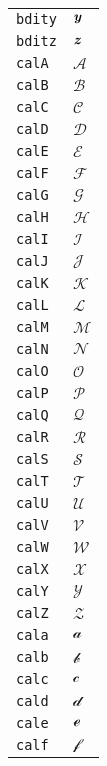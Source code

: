 \begin{longtable}{ll}
\texttt{bdity}&${}{\textbf{\textit{y}}}{}$\\
\texttt{bditz}&${}{\textbf{\textit{z}}}{}$\\
\texttt{calA}&${}{\mathcal{A}}{}$\\
\texttt{calB}&${}{\mathcal{B}}{}$\\
\texttt{calC}&${}{\mathcal{C}}{}$\\
\texttt{calD}&${}{\mathcal{D}}{}$\\
\texttt{calE}&${}{\mathcal{E}}{}$\\
\texttt{calF}&${}{\mathcal{F}}{}$\\
\texttt{calG}&${}{\mathcal{G}}{}$\\
\texttt{calH}&${}{\mathcal{H}}{}$\\
\texttt{calI}&${}{\mathcal{I}}{}$\\
\texttt{calJ}&${}{\mathcal{J}}{}$\\
\texttt{calK}&${}{\mathcal{K}}{}$\\
\texttt{calL}&${}{\mathcal{L}}{}$\\
\texttt{calM}&${}{\mathcal{M}}{}$\\
\texttt{calN}&${}{\mathcal{N}}{}$\\
\texttt{calO}&${}{\mathcal{O}}{}$\\
\texttt{calP}&${}{\mathcal{P}}{}$\\
\texttt{calQ}&${}{\mathcal{Q}}{}$\\
\texttt{calR}&${}{\mathcal{R}}{}$\\
\texttt{calS}&${}{\mathcal{S}}{}$\\
\texttt{calT}&${}{\mathcal{T}}{}$\\
\texttt{calU}&${}{\mathcal{U}}{}$\\
\texttt{calV}&${}{\mathcal{V}}{}$\\
\texttt{calW}&${}{\mathcal{W}}{}$\\
\texttt{calX}&${}{\mathcal{X}}{}$\\
\texttt{calY}&${}{\mathcal{Y}}{}$\\
\texttt{calZ}&${}{\mathcal{Z}}{}$\\
\texttt{cala}&${}{\mathcal{a}}{}$\\
\texttt{calb}&${}{\mathcal{b}}{}$\\
\texttt{calc}&${}{\mathcal{c}}{}$\\
\texttt{cald}&${}{\mathcal{d}}{}$\\
\texttt{cale}&${}{\mathcal{e}}{}$\\
\texttt{calf}&${}{\mathcal{f}}{}$\\

\end{longtable}
